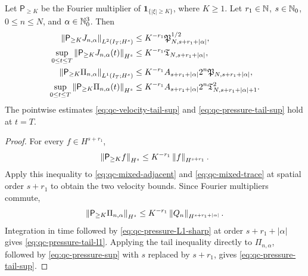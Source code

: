 \begin{proposition}
\label{prop:qc-frequency-tails}
Let \(\mathsf P_{\ge K}\) be the Fourier multiplier of
\(\mathbf 1_{\{|\xi|\ge K\}}\), where \(K\ge1\).  Let
\(r_1\in\mathbb N\), \(s\in\mathbb N_0\), \(0\le n\le N\), and
\(\alpha\in\mathbb N_0^3\).  Then
\begin{align}
 \left\lVert \mathsf P_{\ge K}J_{n,\alpha}\right\rVert_{L^2(I_T;H^s)}
 &\le K^{-r_1}\mathfrak P_{N,s+r_1+|\alpha|}^{1/2},
 \label{eq:qc-velocity-tail-l2}\\
 \sup_{0\le t\le T}
 \left\lVert \mathsf P_{\ge K}J_{n,\alpha}(t)\right\rVert_{H^s}
 &\le K^{-r_1}\mathfrak T_{N,s+r_1+|\alpha|},
 \label{eq:qc-velocity-tail-sup}\\
 \left\lVert \mathsf P_{\ge K}\Pi_{n,\alpha}\right\rVert_{L^1(I_T;H^s)}
 &\le K^{-r_1}A_{s+r_1+|\alpha|}2^n
 \mathfrak P_{N,s+r_1+|\alpha|},
 \label{eq:qc-pressure-tail-l1}\\
 \sup_{0\le t\le T}
 \left\lVert \mathsf P_{\ge K}\Pi_{n,\alpha}(t)\right\rVert_{H^s}
 &\le K^{-r_1}A_{s+r_1+|\alpha|}2^n
 \mathfrak T_{N,s+r_1+|\alpha|+1}^2.
 \label{eq:qc-pressure-tail-sup}
\end{align}
The pointwise estimates \eqref{eq:qc-velocity-tail-sup} and
\eqref{eq:qc-pressure-tail-sup} hold at \(t=T\).
\end{proposition}

\begin{proof}
For every \(f\in H^{s+r_1}\),
\[
 \left\lVert \mathsf P_{\ge K}f\right\rVert_{H^s}
 \le K^{-r_1}\left\lVert f\right\rVert_{H^{s+r_1}}.
\]
Apply this inequality to
\eqref{eq:qc-mixed-adjacent} and \eqref{eq:qc-mixed-trace} at spatial order
\(s+r_1\) to obtain the two velocity bounds.  Since Fourier multipliers
commute,
\[
 \left\lVert \mathsf P_{\ge K}\Pi_{n,\alpha}\right\rVert_{H^s}
 \le K^{-r_1}\left\lVert Q_n\right\rVert_{H^{s+r_1+|\alpha|}}.
\]
Integration in time followed by
\eqref{eq:qc-pressure-L1-sharp} at order \(s+r_1+|\alpha|\) gives
\eqref{eq:qc-pressure-tail-l1}.  Applying the tail inequality directly to
\(\Pi_{n,\alpha}\), followed by \eqref{eq:qc-pressure-sup} with \(s\) replaced
by \(s+r_1\), gives \eqref{eq:qc-pressure-tail-sup}.
\end{proof}

